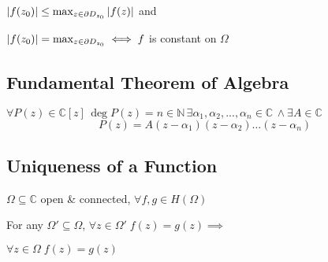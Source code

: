 $\left|f(z_0)\right| \leq \max_{z \in \partial D_{z_0}} \left|f(z)\right|$ and

$\left|f(z_0)\right| = \max_{z \in \partial D_{z_0}} \iff f $ is constant on $\Omega$


\subsection{Fundamental Theorem of Algebra} %
\label{sub:fundamental_theorem_of_algebra}
$\forall P(z) \in \mathbb{C}[z] \, \deg P(z) = n \in \mathbb{N} \, \exists \alpha_1, \alpha_2, ..., \alpha_n \in \mathbb{C} \, \land \exists A \in \mathbb{C}$
\begin{equation*}
	P(z) = A(z - \alpha_1)(z - \alpha_2) \hdots (z - \alpha_n)
\end{equation*}

\subsection{Uniqueness of a Function} %
\label{sub:uniqueness_of_a_function}
$\Omega \subseteq \mathbb{C}$ open \& connected, $\forall f, g \in H(\Omega)$

For any $\Omega' \subseteq \Omega$, $\forall z \in \Omega' \; f(z) = g(z) \implies$

$\forall z \in \Omega \; f(z) = g(z)$

